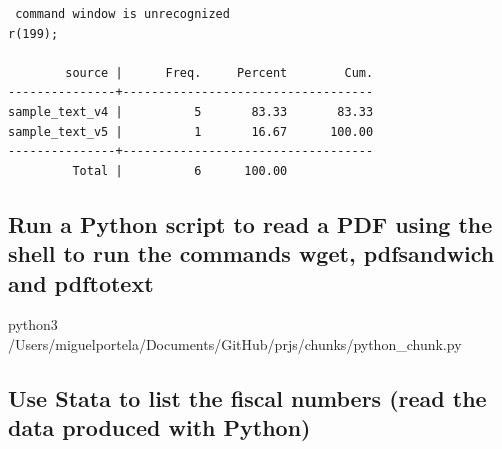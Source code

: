 \documentclass[
  12pt,
]{article}
\newenvironment{Shaded}{\begin{snugshade}}{\end{snugshade}}
\newcommand{\CommentTok}[1]{\textcolor[rgb]{0.56,0.35,0.01}{\textit{#1}}}
\newcommand{\ExtensionTok}[1]{#1}
\newcommand{\KeywordTok}[1]{\textcolor[rgb]{0.13,0.29,0.53}{\textbf{#1}}}
\newcommand{\NormalTok}[1]{#1}
\begin{document}
\begin{verbatim}
 command window is unrecognized
r(199);

        source |      Freq.     Percent        Cum.
---------------+-----------------------------------
sample_text_v4 |          5       83.33       83.33
sample_text_v5 |          1       16.67      100.00
---------------+-----------------------------------
         Total |          6      100.00
\end{verbatim}

\hypertarget{run-a-python-script-to-read-a-pdf-using-the-shell-to-run-the-commands-wget-pdfsandwich-and-pdftotext}{%
\subsection{Run a Python script to read a PDF using the shell to run the commands wget, pdfsandwich and pdftotext}\label{run-a-python-script-to-read-a-pdf-using-the-shell-to-run-the-commands-wget-pdfsandwich-and-pdftotext}}

\begin{Shaded}
\begin{Highlighting}[]
\ExtensionTok{python3}\NormalTok{ /Users/miguelportela/Documents/GitHub/prjs/chunks/python_chunk.py}
\end{Highlighting}
\end{Shaded}

\hypertarget{use-stata-to-list-the-fiscal-numbers-read-the-data-produced-with-python}{%
\subsection{Use Stata to list the fiscal numbers (read the data produced with Python)}\label{use-stata-to-list-the-fiscal-numbers-read-the-data-produced-with-python}}

\begin{Shaded}
\end{Shaded}
\end{document}

